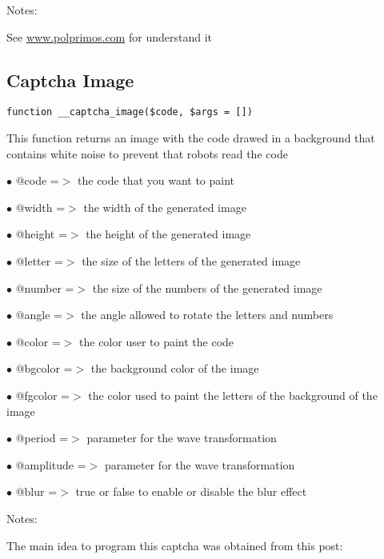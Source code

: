 \documentclass[a4paper]{book}
\def\htmladdnormallink#1#2{\href{#2}{#1}}
\begin{document}
Notes:

See \htmladdnormallink{www.polprimos.com}{www.polprimos.com} for understand it

\hypertarget{toc46}{}
\subsection{Captcha Image}

\begin{lstlisting}
function __captcha_image($code, $args = [])
\end{lstlisting}

This function returns an image with the code drawed in a background that
contains white noise to prevent that robots read the code

\begin{compactitem}
\item[\color{myblue}$\bullet$] @code      =$>$ the code that you want to paint
\item[\color{myblue}$\bullet$] @width     =$>$ the width of the generated image
\item[\color{myblue}$\bullet$] @height    =$>$ the height of the generated image
\item[\color{myblue}$\bullet$] @letter    =$>$ the size of the letters of the generated image
\item[\color{myblue}$\bullet$] @number    =$>$ the size of the numbers of the generated image
\item[\color{myblue}$\bullet$] @angle     =$>$ the angle allowed to rotate the letters and numbers
\item[\color{myblue}$\bullet$] @color     =$>$ the color user to paint the code
\item[\color{myblue}$\bullet$] @bgcolor   =$>$ the background color of the image
\item[\color{myblue}$\bullet$] @fgcolor   =$>$ the color used to paint the letters of the background of the image
\item[\color{myblue}$\bullet$] @period    =$>$ parameter for the wave transformation
\item[\color{myblue}$\bullet$] @amplitude =$>$ parameter for the wave transformation
\item[\color{myblue}$\bullet$] @blur      =$>$ true or false to enable or disable the blur effect
\end{compactitem}

Notes:

The main idea to program this captcha was obtained from this post:
\end{document}
